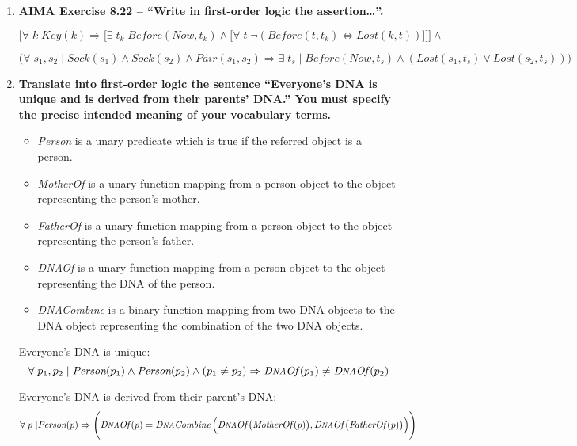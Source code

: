 \begin{enumerate}
\begin{enumerate}
\end{enumerate}

\item \textbf{AIMA Exercise 8.22 -- ``Write in first-order logic the assertion\ldots''.}

$\Bigg[ \forall \; k \; \textit{Key}(k) \Rightarrow \Big[ \exists \; t_k \; \textit{Before}(\textit{Now}, t_k) \land \big[ \forall \; t \; \neg (\textit{Before}(t, t_k) \Leftrightarrow \textit{Lost}(k, t)) \big] \Big] \Bigg] \land$

$\Big(\forall \; s_1, s_2 \; | \; \textit{Sock}(s_1) \land \textit{Sock}(s_2) \land \textit{Pair}(s_1, s_2) \Rightarrow \exists \; t_s \; | \; \textit{Before}(\textit{Now}, t_s) \land (\textit{Lost}(s_1, t_s) \lor \textit{Lost}(s_2, t_s))\Big)$

\item \textbf{Translate into first-order logic the sentence ``Everyone's DNA is unique and is derived from their parents' DNA.'' You must specify the precise intended meaning of your vocabulary terms.}

\begin{itemize}
\item \textit{Person} is a unary predicate which is true if the referred object is a person.
\item \textit{MotherOf} is a unary function mapping from a person object to the object representing the person's mother.
\item \textit{FatherOf} is a unary function mapping from a person object to the object representing the person's father.
\item \textit{D{\footnotesize NA}Of\thinspace} is a unary function mapping from a person object to the object representing the DNA of the person.
\item \textit{D{\footnotesize NA}Combine\thinspace} is a binary function mapping from two DNA objects to the DNA object representing the combination of the two DNA objects.
\end{itemize}

Everyone's DNA is unique:
\begin{displaymath}
\forall \; p_1, p_2 \; | \; \textit{Person}(p_1) \land \textit{Person}(p_2) \land (p_1 \neq p_2) \Rightarrow \textit{D{\footnotesize NA}Of\thinspace}(p_1) \neq \textit{D{\footnotesize NA}Of\thinspace}(p_2)
\end{displaymath}

Everyone's DNA is derived from their parent's DNA:
\begin{displaymath}
\forall \; p \; | \textit{Person}(p) \Rightarrow \Bigg(\textit{D{\footnotesize NA}Of\thinspace}(p) = \textit{D{\footnotesize NA}Combine\thinspace}\Big(\textit{D{\footnotesize NA}Of\thinspace}\big(\textit{MotherOf\thinspace}(p)\big), \textit{D{\footnotesize NA}Of\thinspace}\big(\textit{FatherOf\thinspace}(p)\big)\Big)\Bigg)
\end{displaymath}

\end{enumerate}


